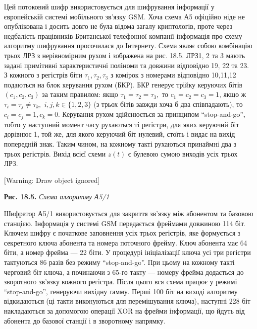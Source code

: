 Цей потоковий шифр використовується для шифрування інформації у європейській
системі мобільного зв’язку GSM.  Хоча схема А5 офіційно ніде не опублікована і
досить довго не була відома загалу криптологів, проте через недбалість
працівників Британської телефонної компанії інформація про схему алгоритму
шифрування просочилася до Інтернету. Схема являє собою комбінацію трьох ЛРЗ з
нерівномірним рухом і зображена на рис. 18.5. ЛРЗ1, 2 та 3 мають задані
примітивні характеристичні поліноми та довжини відповідно 19, 22 та 23. З
кожного з регістрів біти  $\tau _{1},\tau _{2},\tau _3$ з комірок з
номерами відповідно  10,11,12 подаються на блок керування рухом (БКР).  БКР 
генерує трійку керуючих бітів  $(c_{1},c_{2},c_3)$ за таким правилом:
якщо  $\tau _{1}=\tau _{2}=\tau _3,$ то 
$c_{1}=c_{2}=c_3=1$, якщо ж  ${\tau _{i}=\tau _{j}\neq \tau
_{k},}$  $i,j,k\in \{1,2,3\}$ (з трьох бітів завжди хоча б два
співпадають), то  $c_{i}=c_{j}=1,c_k=0\text{.}$ Керування рухом
здійснюється за принципом “stop{}-and{}-go”, тобто у наступний момент часу
рухаються ті регістри, для яких керуючий біт дорівнює 1, той же, для якого
керуючий біт нулевий, стоїть і видає на вихід попередній знак. Таким чином, на
кожному такті рухаються принаймні два з трьох регістрів. Вихід всієї схеми 
$z(t)$ є булевою сумою виходів  усіх трьох ЛРЗ.

[Warning: Draw object ignored]

{\centering
\textbf{Рис. 1}\textbf{8}\textbf{.5. }\textit{Схема алгоритму А5}\textit{/1}
\par}


\bigskip

Шифратор А5/1 використовується для закриття зв’язку між абонентом та базовою
станцією. Інформація у системі GSM передається фреймами довжиною 114 біт.
Ключем шифру є початкове заповнення усіх трьох регістрів, яке формується з
секретного ключа абонента та номера поточного фрейму. Ключ абонента має 64
біти, а номер фрейма --- 22 біти. У процедурі ініціалізації ключа усі три
регістри тактуються 86 разів без режиму “stop{}-and{}-go”. При цьому на кожному
такті черговий біт ключа, а починаючи з 65-го такту --- номеру фрейма додається
до зворотного зв’язку кожного регістра. Після цього вся схема працює у режимі
“stop{}-and{}-go”, генеруючи вихідну гамму. Перші 100 біт на виході алгоритму
відкидаються (ці такти виконуються для перемішування ключа), наступні 228 біт
накладаються за допомогою операції XOR на  фрейми інформації, що йдуть від
абонента до базової станції і в зворотному напрямку.

